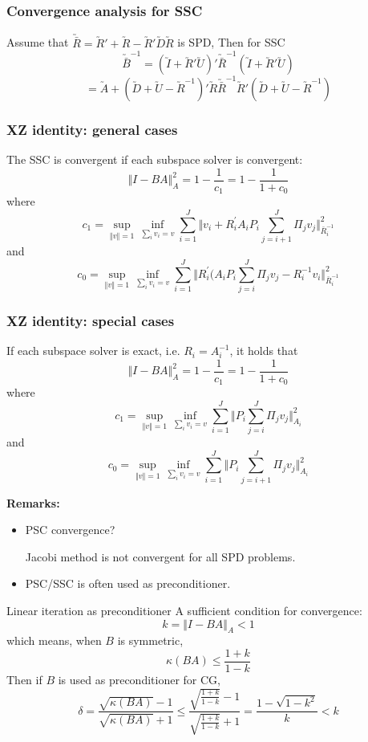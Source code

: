 \begin{frame}
\frametitle{Convergence analysis for SSC}
\begin{theorem}
Assume that $\utilde{\bar{R}}=\utilde{R}'+\utilde{R}-\utilde{R}'\utilde{D}\utilde{R}$
is SPD, Then for SSC
$$\utilde{\bar{B}}^{-1} =(\utilde{I}+\utilde{R}' \utilde{U})' 
\utilde{\bar{R}}^{-1}
(\utilde{I}+\utilde{R}' \utilde{U})$$ 
$$=\utilde{A}+(\utilde{D}+\utilde{U}-\utilde{R}^{-1})'\utilde{R}
\utilde{\bar{R}}^{-1}
\utilde{R}'(\utilde{D}+\utilde{U}-\utilde{R}^{-1})$$
\end{theorem}
\end{frame}

\begin{frame}
\frametitle{XZ identity: general cases}
\begin{theorem}
The SSC is convergent if each subspace solver is convergent:
$$\Vert I-B A \Vert_{A}^{2}=1-\frac{1}{c_{1}}=1-\frac{1}{1+c_{0}}$$
where 
$$
c_{1}=\sup_{\Vert v \Vert=1}\inf_{\sum_{i} v_i=v}
\sum_{i=1}^{J}\Vert v_{i}+R_{i}^{\prime} A_{i} P_{i}
\sum_{j=i+1}^{J} \Pi_{j} v_{j}\Vert_{\bar{R}_{i}^{-1}}^{2}
$$
and
$$
c_{0}=\sup_{\Vert v \Vert=1}\inf_{\sum_{i} v_i=v}
\sum_{i=1}^{J}\Vert R_{i}^{\prime}(A_{i} P_{i}
\sum_{j=i}^{J} \Pi_{j} v_{j}-R_i^{-1}v_i \Vert_{\bar{R}_{i}^{-1}}^{2}
$$
\end{theorem}
\end{frame}

\begin{frame}
\frametitle{XZ identity: special cases}
\begin{theorem}
If each subspace solver is exact, i.e. $R_i=A_i^{-1}$, it holds that
$$\Vert I-B A \Vert_{A}^{2}=1-\frac{1}{c_{1}}=1-\frac{1}{1+c_{0}}$$
where 
$$
c_{1}=\sup_{\Vert v \Vert=1}\inf_{\sum_{i} v_i=v}
\sum_{i=1}^{J}\Vert P_{i}
\sum_{j=i}^{J} \Pi_{j} v_{j}\Vert_{A_i}^{2}
$$
and
$$
c_{0}=\sup_{\Vert v \Vert=1}\inf_{\sum_{i} v_i=v}
\sum_{i=1}^{J}\Vert P_{i}
\sum_{j=i+1}^{J} \Pi_{j} v_{j}\Vert_{A_i}^{2}
$$
\end{theorem}
\end{frame}

\begin{frame}
\textbf{Remarks:}
\begin{itemize}
 \item PSC convergence?
 
 Jacobi method is not convergent for all SPD problems.
 
 \item PSC/SSC is often used as preconditioner.
\end{itemize}

\begin{block}{Linear iteration as preconditioner}
A sufficient condition for convergence:
$$k=\Vert I-BA \Vert_A <1$$
which means, when $B$ is symmetric,
$$\kappa(BA)\le \frac{1+k}{1-k}$$ 
Then if $B$ is used as preconditioner for CG,
$$\delta=\frac{\sqrt{\kappa(BA)}-1}{\sqrt{\kappa(BA)}+1}\le \frac{\sqrt{\frac{1+k}{1-k}}-1}{\sqrt{\frac{1+k}{1-k}}+1}=
\frac{1-\sqrt{1-k^2}}{k}<k$$
\end{block}
\end{frame}
